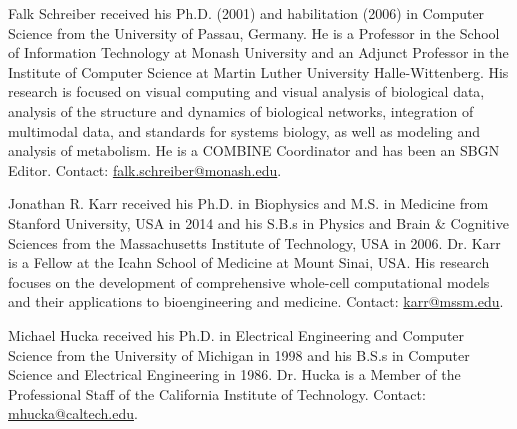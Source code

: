 \documentclass[journal,transmag]{IEEEtran}
\begin{document}
\begin{IEEEbiography}{Falk Schreiber} 
received his Ph.D. (2001) and habilitation (2006) in Computer Science from the University of Passau, Germany. 
He is a Professor in the School of Information Technology at Monash University and an Adjunct Professor in the Institute of Computer Science at Martin Luther University Halle-Wittenberg. 
His research is focused on visual computing and visual analysis of biological data, analysis of the structure and dynamics of biological networks, integration of multimodal data, and standards for systems biology, as well as modeling and analysis of metabolism. 
He is a COMBINE Coordinator and has been an SBGN Editor.
Contact: \href{mailto:falk.schreiber@monash.edu}{falk.schreiber@monash.edu}.
\end{IEEEbiography}

\begin{IEEEbiography}{Jonathan R. Karr}
received his Ph.D. in Biophysics and M.S. in Medicine from Stanford University, USA in 2014 and his S.B.s in Physics and Brain \& Cognitive Sciences from the Massachusetts Institute of Technology, USA in 2006. 
Dr. Karr is a Fellow at the Icahn School of Medicine at Mount Sinai, USA. 
His research focuses on the development of comprehensive whole-cell computational models and their applications to bioengineering and medicine. 
Contact: \href{mailto:karr@mssm.edu}{karr@mssm.edu}.
\end{IEEEbiography}

\begin{IEEEbiography}{Michael Hucka}
received his Ph.D. in Electrical Engineering and Computer Science from the University of Michigan in 1998 and his B.S.s in Computer Science and Electrical Engineering in 1986.
Dr. Hucka is a Member of the Professional Staff of the California Institute of Technology.
Contact: \href{mailto:mhucka@caltech.edu}{mhucka@caltech.edu}.
\end{IEEEbiography}
\end{document}
